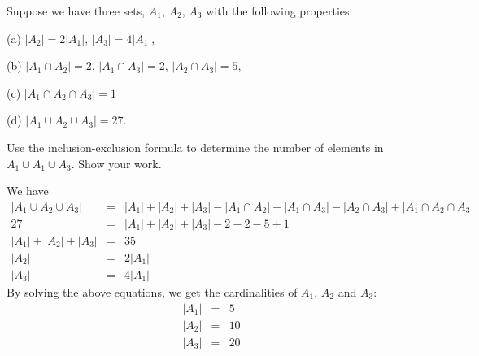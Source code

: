 \documentclass[11pt]{article}
\begin{document}
\begin{problem}
Suppose we have three sets, $A_1$, $A_2$, $A_3$
with the following properties:
%
\begin{description}

\item{(a)} $|A_2| = 2|A_1|$, $|A_3| = 4|A_1|$,
               
\item{(b)} $|A_1\cap A_2| = 2 $,
        $|A_1\cap A_3| = 2$,
        $|A_2\cap A_3| = 5$,

\item{(c)}
$|A_1\cap A_2\cap A_3| = 1$

\item{(d)}
$|A_1\cup A_2\cup A_3| = 27$.

\end{description}
%
Use the inclusion-exclusion formula to
determine the number of elements in $A_1\cup A_1\cup A_3$.
Show your work.
\end{problem}


\begin{solution}
We have
\begin{eqnarray*}
        |A_1\cup A_2\cup A_3| &=& |A_1| +|A_2| + |A_3| -|A_1\cap A_2| -|A_1\cap A_3| -|A_2\cap A_3| + |A_1\cap A_2\cap A_3| \\
        27 &=& |A_1| + |A_2| + |A_3| - 2 - 2 - 5 + 1 \\
        |A_1| + |A_2| + |A_3| &=& 35 \\
	|A_2| &=& 2 |A_1| \\
	|A_3| &=& 4 |A_1| 
\end{eqnarray*}
By solving the above equations, we get the cardinalities of $A_1$, $A_2$ and $A_3$:
\begin{eqnarray*}
  |A_1| &=& 5\\
  |A_2| &=& 10\\
  |A_3| &=& 20
\end{eqnarray*}
\end{solution}

\end{document}
